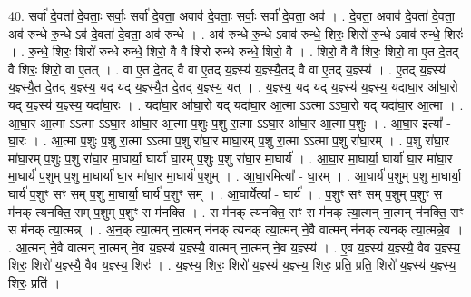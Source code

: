 \documentclass[17pt]{extarticle}
\begin{document}
40. सर्वा॑ दे॒वता॑ दे॒वताः॒ सर्वाः॒ सर्वा॑ दे॒वता॒ अवाव॑ दे॒वताः॒ सर्वाः॒ सर्वा॑ दे॒वता॒ अव॑ । . दे॒वता॒ अवाव॑ दे॒वता॑ दे॒वता॒ अव॑ रुन्धे रु॒न्धे ऽव॑ दे॒वता॑ दे॒वता॒ अव॑ रुन्धे । . अव॑ रुन्धे रु॒न्धे ऽवाव॑ रुन्धे॒ शिरः॒ शिरो॑ रु॒न्धे ऽवाव॑ रुन्धे॒ शिरः॑ । . रु॒न्धे॒ शिरः॒ शिरो॑ रुन्धे रुन्धे॒ शिरो॒ वै वै शिरो॑ रुन्धे रुन्धे॒ शिरो॒ वै । . शिरो॒ वै वै शिरः॒ शिरो॒ वा ए॒त दे॒तद् वै शिरः॒ शिरो॒ वा ए॒तत् । . वा ए॒त दे॒तद् वै वा ए॒तद् य॒ज्ञ्स्य॑ य॒ज्ञ्स्यै॒तद् वै वा ए॒तद् य॒ज्ञ्स्य॑ । . ए॒तद् य॒ज्ञ्स्य॑ य॒ज्ञ्स्यै॒त दे॒तद् य॒ज्ञ्स्य॒ यद् यद् य॒ज्ञ्स्यै॒त दे॒तद् य॒ज्ञ्स्य॒ यत् । . य॒ज्ञ्स्य॒ यद् यद् य॒ज्ञ्स्य॑ य॒ज्ञ्स्य॒ यदा॑घा॒र आ॑घा॒रो यद् य॒ज्ञ्स्य॑ य॒ज्ञ्स्य॒ यदा॑घा॒रः । . यदा॑घा॒र आ॑घा॒रो यद् यदा॑घा॒र आ॒त्मा ऽऽत्मा ऽऽघा॒रो यद् यदा॑घा॒र आ॒त्मा । . आ॒घा॒र आ॒त्मा ऽऽत्मा ऽऽघा॒र आ॑घा॒र आ॒त्मा प॒शुः प॒शु रा॒त्मा ऽऽघा॒र आ॑घा॒र आ॒त्मा प॒शुः । . आ॒घा॒र इत्या᳚ - घा॒रः । . आ॒त्मा प॒शुः प॒शु रा॒त्मा ऽऽत्मा प॒शु रा॑घा॒र मा॑घा॒रम् प॒शु रा॒त्मा ऽऽत्मा प॒शु रा॑घा॒रम् । . प॒शु रा॑घा॒र मा॑घा॒रम् प॒शुः प॒शु रा॑घा॒र मा॒घार्या॒ घार्या॑ घा॒रम् प॒शुः प॒शु रा॑घा॒र मा॒घार्य॑ । . आ॒घा॒र मा॒घार्या॒ घार्या॑ घा॒र मा॑घा॒र मा॒घार्य॑ प॒शुम् प॒शु मा॒घार्या॑ घा॒र मा॑घा॒र मा॒घार्य॑ प॒शुम् । . आ॒घा॒रमित्या᳚ - घा॒रम् । . आ॒घार्य॑ प॒शुम् प॒शु मा॒घार्या॒ घार्य॑ प॒शुꣳ सꣳ सम् प॒शु मा॒घार्या॒ घार्य॑ प॒शुꣳ सम् । . आ॒घार्येत्या᳚ - घार्य॑ । . प॒शुꣳ सꣳ सम् प॒शुम् प॒शुꣳ स म॑नक् त्यनक्ति॒ सम् प॒शुम् प॒शुꣳ स म॑नक्ति । . स म॑नक् त्यनक्ति॒ सꣳ स म॑नक् त्या॒त्मन् ना॒त्मन् न॑नक्ति॒ सꣳ स म॑नक् त्या॒त्मन्न् । . अ॒न॒क् त्या॒त्मन् ना॒त्मन् न॑नक् त्यनक् त्या॒त्मन् ने॒वै वात्मन् न॑नक् त्यनक् त्या॒त्मन्ने॒व । . आ॒त्मन् ने॒वै वात्मन् ना॒त्मन् ने॒व य॒ज्ञ्स्य॑ य॒ज्ञ्स्यै॒ वात्मन् ना॒त्मन् ने॒व य॒ज्ञ्स्य॑ । . ए॒व य॒ज्ञ्स्य॑ य॒ज्ञ्स्यै॒ वैव य॒ज्ञ्स्य॒ शिरः॒ शिरो॑ य॒ज्ञ्स्यै॒ वैव य॒ज्ञ्स्य॒ शिरः॑ । . य॒ज्ञ्स्य॒ शिरः॒ शिरो॑ य॒ज्ञ्स्य॑ य॒ज्ञ्स्य॒ शिरः॒ प्रति॒ प्रति॒ शिरो॑ य॒ज्ञ्स्य॑ य॒ज्ञ्स्य॒ शिरः॒ प्रति॑ । \newline
\pagebreak
{}
\end{document}
